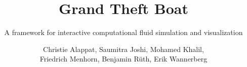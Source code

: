 \documentclass[11pt,a4paper]{scrartcl}
\begin{document}

\title{Grand Theft Boat}
\subtitle{A framework for interactive computational fluid simulation and
visualization}
\author{Christie Alappat, Saumitra Joshi, Mohamed Khalil, \\ Friedrich Menhorn, Benjamin Rüth, Erik Wannerberg}

\maketitle

\tableofcontents

\listoftodos





















\clearpage
\newpage


\end{document}
